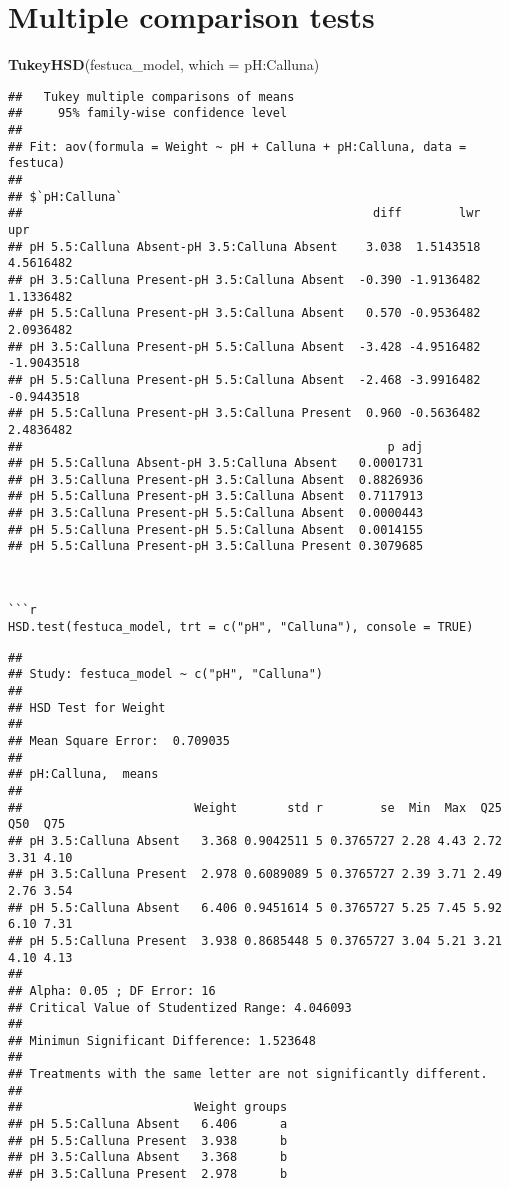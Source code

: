 \documentclass[
]{article}
\newenvironment{Shaded}{\begin{snugshade}}{\end{snugshade}}
\newcommand{\AttributeTok}[1]{\textcolor[rgb]{0.13,0.29,0.53}{#1}}
\newcommand{\FunctionTok}[1]{\textcolor[rgb]{0.13,0.29,0.53}{\textbf{#1}}}
\newcommand{\NormalTok}[1]{#1}
\newcommand{\StringTok}[1]{\textcolor[rgb]{0.31,0.60,0.02}{#1}}
\begin{document}
\hypertarget{multiple-comparison-tests}{%
\section{Multiple comparison tests}\label{multiple-comparison-tests}}

\begin{Shaded}
\begin{Highlighting}[]
\FunctionTok{TukeyHSD}\NormalTok{(festuca\_model, }\AttributeTok{which =} \StringTok{\textquotesingle{}pH:Calluna\textquotesingle{}}\NormalTok{)}
\end{Highlighting}
\end{Shaded}

\begin{verbatim}
##   Tukey multiple comparisons of means
##     95% family-wise confidence level
## 
## Fit: aov(formula = Weight ~ pH + Calluna + pH:Calluna, data = festuca)
## 
## $`pH:Calluna`
##                                                 diff        lwr        upr
## pH 5.5:Calluna Absent-pH 3.5:Calluna Absent    3.038  1.5143518  4.5616482
## pH 3.5:Calluna Present-pH 3.5:Calluna Absent  -0.390 -1.9136482  1.1336482
## pH 5.5:Calluna Present-pH 3.5:Calluna Absent   0.570 -0.9536482  2.0936482
## pH 3.5:Calluna Present-pH 5.5:Calluna Absent  -3.428 -4.9516482 -1.9043518
## pH 5.5:Calluna Present-pH 5.5:Calluna Absent  -2.468 -3.9916482 -0.9443518
## pH 5.5:Calluna Present-pH 3.5:Calluna Present  0.960 -0.5636482  2.4836482
##                                                   p adj
## pH 5.5:Calluna Absent-pH 3.5:Calluna Absent   0.0001731
## pH 3.5:Calluna Present-pH 3.5:Calluna Absent  0.8826936
## pH 5.5:Calluna Present-pH 3.5:Calluna Absent  0.7117913
## pH 3.5:Calluna Present-pH 5.5:Calluna Absent  0.0000443
## pH 5.5:Calluna Present-pH 5.5:Calluna Absent  0.0014155
## pH 5.5:Calluna Present-pH 3.5:Calluna Present 0.3079685
\end{verbatim}

\begin{verbatim}


```r
HSD.test(festuca_model, trt = c("pH", "Calluna"), console = TRUE)
\end{verbatim}

\begin{verbatim}
## 
## Study: festuca_model ~ c("pH", "Calluna")
## 
## HSD Test for Weight 
## 
## Mean Square Error:  0.709035 
## 
## pH:Calluna,  means
## 
##                        Weight       std r        se  Min  Max  Q25  Q50  Q75
## pH 3.5:Calluna Absent   3.368 0.9042511 5 0.3765727 2.28 4.43 2.72 3.31 4.10
## pH 3.5:Calluna Present  2.978 0.6089089 5 0.3765727 2.39 3.71 2.49 2.76 3.54
## pH 5.5:Calluna Absent   6.406 0.9451614 5 0.3765727 5.25 7.45 5.92 6.10 7.31
## pH 5.5:Calluna Present  3.938 0.8685448 5 0.3765727 3.04 5.21 3.21 4.10 4.13
## 
## Alpha: 0.05 ; DF Error: 16 
## Critical Value of Studentized Range: 4.046093 
## 
## Minimun Significant Difference: 1.523648 
## 
## Treatments with the same letter are not significantly different.
## 
##                        Weight groups
## pH 5.5:Calluna Absent   6.406      a
## pH 5.5:Calluna Present  3.938      b
## pH 3.5:Calluna Absent   3.368      b
## pH 3.5:Calluna Present  2.978      b
\end{verbatim}
\end{document}
